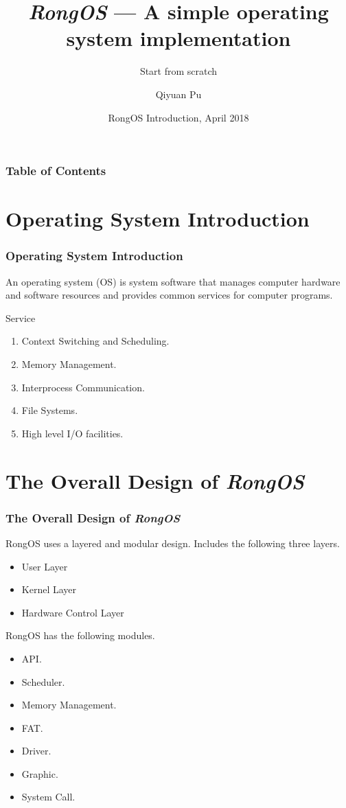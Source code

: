 \documentclass{beamer}
\title[\emph{RongOS}] %
{\emph{RongOS} — A simple operating system implementation}
\subtitle{Start from scratch}
\author[Qiyuan, Pu] %
{Qiyuan Pu}
\institute[SWFU] %
{
  School of Big Data and Intelligence Engineering\\
  Southwest Forestry University
}
\date[RongOS Intro 2018] %
{RongOS Introduction, April 2018}
\begin{document}
 
\frame{\titlepage}


\begin{frame}
\frametitle{Table of Contents}
\tableofcontents
\end{frame}

\section{Operating System Introduction}
\begin{frame}
\frametitle{Operating System Introduction}
An operating system (OS) is system software that manages computer hardware and software
resources and provides common services for computer programs.


\begin{alertblock}{Service}
  \begin{enumerate}
  \item Context Switching and Scheduling.
  \item Memory Management.
  \item Interprocess Communication.
  \item File Systems.
  \item High level I/O facilities.
  \end{enumerate}
\end{alertblock}

\end{frame}
  

\section{The Overall Design of \emph{RongOS}}

\begin{frame}
\frametitle{The Overall Design of \emph{RongOS}}
RongOS uses a layered and modular design. Includes the following three layers.
\begin{itemize}
\item User Layer
\item Kernel Layer
\item Hardware Control Layer
\end{itemize}
RongOS has the following modules.
\begin{itemize}
\item API.
\item Scheduler.
\item Memory Management.
\item FAT.
\item Driver.
\item Graphic.
\item System Call.
\end{itemize}

\end{frame}
\end{document}
